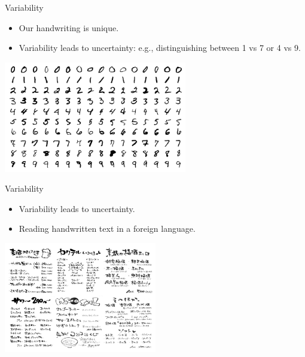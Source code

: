 \documentclass{beamer}
\begin{document}
\begin{frame}{Variability}
\begin{itemize}
  \item Our handwriting is unique.
  \item Variability leads to uncertainty: e.g., distinguishing between 1 vs 7 or 4 vs 9.
\end{itemize}
\begin{center}
  \includegraphics[width=0.6\textwidth]{handwriting_example.png}
\end{center}
\end{frame}

\begin{frame}{Variability}
\begin{itemize}
  \item Variability leads to uncertainty.
  \item Reading handwritten text in a foreign language.
\end{itemize}
\begin{center}
  \includegraphics[width=0.5\textwidth]{foreign_handwriting.png}
\end{center}
\end{frame}
\end{document}
